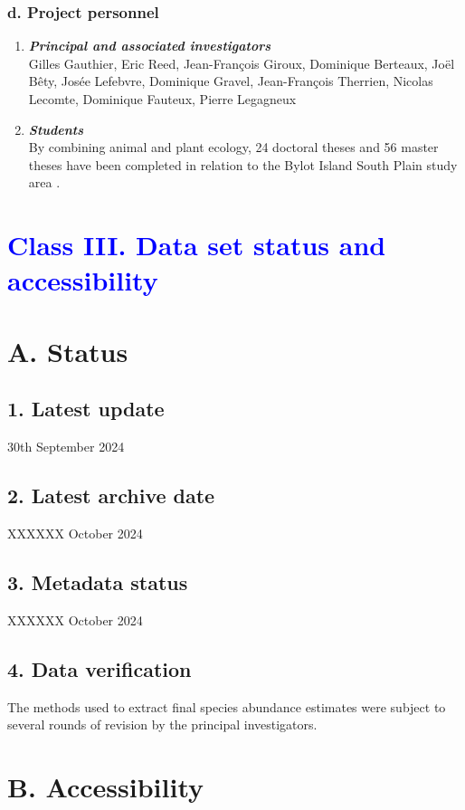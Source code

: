 \documentclass[a4paper,twoside,12pt]{article}
\begin{document}
                \subsubsection*{d. Project personnel}
                \begin{enumerate}[label=\alph*.]
                        \item[] \textit{\textbf{Principal and associated investigators}}\\
                        Gilles Gauthier, Eric Reed, Jean-François Giroux, Dominique Berteaux, Joël Bêty, Josée Lefebvre, Dominique Gravel, Jean-François Therrien, Nicolas Lecomte, Dominique Fauteux, Pierre Legagneux \citep{gauthier2024b}
                        \item[] \textit{\textbf{Students}}\\
                        By combining animal and plant ecology, 24 doctoral theses and 56 master theses have been completed in relation to the Bylot Island South Plain study area \citep{gauthier2024b}.
                \end{enumerate}
\newpage 
 \section*{\textcolor{Blue}{Class III. Data set status and accessibility}}
    \section*{A. Status}
                \subsection*{1. Latest update} 30th September 2024
        \subsection*{2. Latest archive date} XXXXXX October 2024
        \subsection*{3. Metadata status} XXXXXX October 2024
        \subsection*{4. Data verification} The methods used to extract final species abundance estimates were subject to several rounds of revision by the principal investigators.
   \section*{B. Accessibility}
\end{document}
